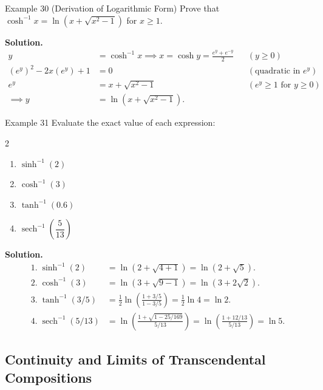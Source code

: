 \begin{examplebox}{Example 30 (Derivation of Logarithmic Form)}
Prove that \(\cosh^{-1} x = \ln\!\left(x + \sqrt{x^2 - 1}\right)\) for \(x \ge 1\).

\medskip
\textbf{Solution.}
\begin{align*}
y &= \cosh^{-1} x \implies x = \cosh y = \frac{e^y + e^{-y}}{2} && (y \ge 0) \\[4pt]
(e^y)^2 - 2x(e^y) + 1 &= 0 && (\text{quadratic in } e^y) \\[4pt]
e^y &= x + \sqrt{x^2 - 1} && (e^y \ge 1 \text{ for } y \ge 0) \\[4pt]
\implies y &= \ln\!\left(x + \sqrt{x^2 - 1}\right).
\end{align*}
\end{examplebox}

\begin{examplebox}{Example 31}
Evaluate the exact value of each expression:
\begin{multicols}{2}
\begin{enumerate}
    \item \(\sinh^{-1}(2)\)
    \item \(\cosh^{-1}(3)\)
    \item \(\tanh^{-1}(0.6)\)
    \item \(\operatorname{sech}^{-1}\!\left(\dfrac{5}{13}\right)\)
\end{enumerate}
\end{multicols}

\medskip
\textbf{Solution.}
\begin{align*}
1.\; \sinh^{-1}(2) &= \ln(2 + \sqrt{4 + 1}) = \ln(2 + \sqrt{5}). \\[4pt]
2.\; \cosh^{-1}(3) &= \ln(3 + \sqrt{9 - 1}) = \ln(3 + 2\sqrt{2}). \\[4pt]
3.\; \tanh^{-1}(3/5) &= \frac{1}{2}\ln\!\left(\frac{1 + 3/5}{1 - 3/5}\right) = \frac{1}{2}\ln 4 = \ln 2. \\[4pt]
4.\; \operatorname{sech}^{-1}(5/13) &= \ln\!\left(\frac{1 + \sqrt{1 - 25/169}}{5/13}\right) = \ln\!\left(\frac{1 + 12/13}{5/13}\right) = \ln 5.
\end{align*}
\end{examplebox}

\subsection*{Continuity and Limits of Transcendental Compositions}
\label{subsec:1.7.6}

